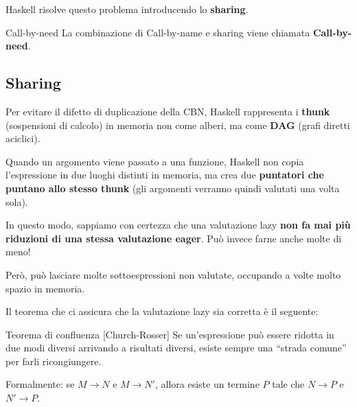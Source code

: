 Haskell risolve questo problema introducendo lo \textbf{sharing}.

\begin{defframe}{Call-by-need}{}
    La combinazione di Call-by-name e sharing viene chiamata \textbf{Call-by-need}.
\end{defframe}

\subsection{Sharing}
Per evitare il difetto di duplicazione della CBN, Haskell rappresenta i \textbf{thunk} (sospensioni di calcolo) in memoria non come alberi, ma come \textbf{DAG} (grafi diretti aciclici).

Quando un argomento viene passato a una funzione, Haskell non copia l'espressione in due luoghi distinti in memoria, ma crea due \textbf{puntatori che puntano allo stesso thunk} (gli argomenti verranno quindi valutati una volta sola).

In questo modo, sappiamo con certezza che una valutazione lazy \textbf{non fa mai più riduzioni di una stessa valutazione eager}. Può invece farne anche molte di meno!

Però, può lasciare molte sottoespressioni non valutate, occupando a volte molto spazio in memoria.

Il teorema che ci assicura che la valutazione lazy sia corretta è il seguente:
\begin{thmframe}{Teorema di confluenza [Church-Rosser]}{}
    \label{thm:church_rosser}
    Se un'espressione può essere ridotta in due modi diversi arrivando a risultati diversi, esiste sempre una ``strada comune'' per farli ricongiungere.

    Formalmente: se $M \to N$ e $M \to N'$, allora esiste un termine $P$ tale che $N \to P$ e $N' \to P$.
\begin{center}
\end{center}

\end{thmframe}

